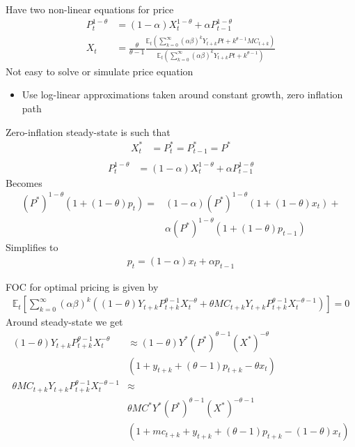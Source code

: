 \documentclass{beamer}
\begin{document}
\begin{frame}
  Have two non-linear equations for price
\begin{align}
    P_t^{1-\theta} &= (1-\alpha)X_t^{1-\theta} + \alpha P_{t-1}^{1-\theta}\\
    X_t &= \frac{\theta}{\theta-1} \frac{\mathbb{E}_t \left(\sum_{k=0}^{\infty}(\alpha \beta)^k Y_{t+k}P{t+k}^{\theta-1}MC_{t+k} \right)}
  {\mathbb{E}_t \left(\sum_{k=0}^{\infty}(\alpha \beta)^k Y_{t+k}P{t+k}^{\theta-1} \right) }
\end{align}
\medskip
  Not easy to solve or simulate price equation
  \begin{itemize}
    \item  Use log-linear approximations taken around constant growth, zero inflation path
  \end{itemize}
\end{frame}

\begin{frame}  
  Zero-inflation steady-state is such that  
    \begin{align}
    X_t^* &= P_t^*=P^*_{t-1}=P^*\\  
  \end{align}
  \begin{align}
    P_t^{1-\theta} &= (1-\alpha)X_t^{1-\theta} + \alpha P_{t-1}^{1-\theta}
  \end{align}
  Becomes
  \begin{align}
    (P^*)^{1-\theta} (1+(1-\theta)p_t)=& (1-\alpha)(P^*)^{1-\theta} (1+(1-\theta)x_t)+ \\ \nonumber
    &\alpha(P^*)^{1-\theta}(1+(1-\theta)p_{t-1})
  \end{align}
  Simplifies to
  \begin{align}
    p_t=(1-\alpha)x_t+\alpha p_{t-1}
  \end{align}
\end{frame}

\begin{frame} 
 FOC for optimal pricing is given by
 \begin{align}
   \mathbb{E}_t \left [ \sum_{k=0}^{\infty} (\alpha \beta)^k \left( (1-\theta)Y_{t+k}P_{t+k}^{\theta-1}X_t^{-\theta} + \theta MC_{t+k}Y_{t+k}P_{t+k}^{\theta-1}X_t^{-\theta-1} \right)\right]=0
 \end{align}
 Around steady-state we get
 \begin{align}
   (1-\theta)Y_{t+k}P_{t+k}^{\theta-1}X_t^{-\theta} & \approx  (1-\theta)Y^*(P^*)^{\theta-1}(X^*)^{-\theta} \\ \nonumber 
   &(1+y_{t+k}+(\theta-1)p_{t+k}-\theta x_t)\\
  \theta MC_{t+k}Y_{t+k}P_{t+k}^{\theta-1}X_t^{-\theta-1} & \approx \\ \nonumber 
  & \theta MC^* Y^* (P^*)^{\theta-1} (X^*)^{-\theta-1} \\ \nonumber &(1+mc_{t+k} + y_{t+k} + (\theta -1) p_{t+k} - (1-\theta) x_t)
 \end{align}
\end{frame}
\end{document}
